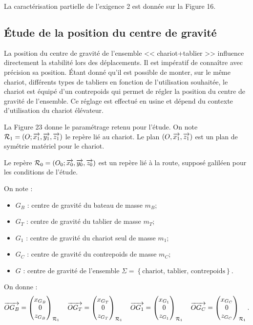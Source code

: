 \documentclass[10pt,fleqn]{article} %
\begin{document}
La caractérisation partielle de l'exigence 2 est donnée sur la Figure 16.

\subsection{Étude de la position du centre de gravité}

La position du centre de gravité de l’ensemble << chariot+tablier >> influence directement la stabilité lors des déplacements. Il est impératif de connaître avec précision sa position.
Étant donné qu’il est possible de monter, sur le même chariot, différents types de tabliers en fonction de l’utilisation souhaitée, le chariot est équipé d’un contrepoids qui permet de régler la position du centre de gravité de l’ensemble. Ce réglage est effectué en usine et dépend du contexte d’utilisation du chariot élévateur.

La Figure 23 donne le paramétrage retenu pour l’étude. On note $\mathcal{R}_1=\left(O;\overrightarrow{x_1},\overrightarrow{y_1},\overrightarrow{z_1} \right)$ le repère lié au chariot. Le plan $\left(O,\overrightarrow{x_1},\overrightarrow{z_1}\right)$ est un plan de symétrie matériel pour le chariot.

Le repère $\mathcal{R}_0=\left(O_0;\overrightarrow{x_0},\overrightarrow{y_0},\overrightarrow{z_0} \right)$ est un repère lié à la route, supposé galiléen pour les conditions de l'étude. 

On note : 
\begin{itemize}
\item $G_B$ : centre de gravité du bateau de masse $m_B$;
\item $G_T$ : centre de gravité du tablier de masse $m_T$;
\item $G_1$ : centre de gravité du chariot seul de masse $m_1$;
\item $G_C$ : centre de gravité du contrepoids de masse $m_C$;
\item $G$ : centre de gravité de l'ensemble $\Sigma=\left\{\text{chariot, tablier, contrepoids}\right\}$. 
\end{itemize}
On donne : 
$$
\overrightarrow{OG_B} = \begin{pmatrix}x_{G_B}\\0\\z_{G_B}\end{pmatrix}_{\mathcal{R}_1} \quad
\overrightarrow{OG_T} = \begin{pmatrix}x_{G_T}\\0\\z_{G_T}\end{pmatrix}_{\mathcal{R}_1} \quad
\overrightarrow{OG_1} = \begin{pmatrix}x_{G_1}\\0\\z_{G_1}\end{pmatrix}_{\mathcal{R}_1} \quad
\overrightarrow{OG_C} = \begin{pmatrix}x_{G_C}\\0\\z_{G_C}\end{pmatrix}_{\mathcal{R}_1}.
$$
\end{document}
